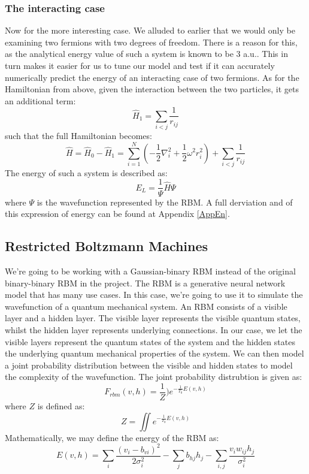 \documentclass{article}
\begin{document}
\subsubsection{The interacting case}
Now for the more interesting case. We alluded to earlier that we would only be examining two fermions with two degrees of freedom. There is a reason for this, as the analytical energy value of such a system is known to be 3 a.u.. This in turn makes it easier for us to tune our model and test if it can accurately numerically predict the energy of an interacting case of two fermions. \newline
As for the Hamiltonian from above, given the interaction between the two particles, it gets an additional term:
\begin{equation} \label{H1}
    \hat H_1 = \sum_{i<j} \frac{1}{r_{ij}}
\end{equation}
such that the full Hamiltonian becomes:
\begin{equation} \label{ham}
    \hat H = \hat H_0 - \hat H_1 = \sum_{i=1}^N \left( - \frac{1}{2}\nabla_i^2 + \frac{1}{2}\omega^2 r_i^2 \right) + \sum_{i<j} \frac{1}{r_{ij}}
\end{equation}
The energy of such a system is described as:
\begin{equation} \label{locEn}
    E_L = \frac{1}{\Psi} \hat H \Psi
\end{equation}
where $\Psi$ is the wavefunction represented by the RBM. A full derviation and of this expression of energy can be found at Appendix \ref{AppEn}.
\subsection{Restricted Boltzmann Machines}
We're going to be working with a Gaussian-binary RBM instead of the original binary-binary RBM in the project. The RBM is a generative neural network model that has many use cases. In this case, we're going to use it to simulate the wavefunction of a quantum mechanical system. An RBM consists of a visible layer and a hidden layer. The visible layer represents the visible quantum states, whilst the hidden layer represents underlying connections. \newline
In our case, we let the visible layers represent the quantum states of the system and the hidden states the underlying quantum mechanical properties of the system. We can then model a joint probability distribution between the visible and hidden states to model the complexity of the wavefunction.
\newline
The joint probability distrubtion is given as:
\begin{equation}
    F_{rbm}(v,h) = \frac{1}{Z}) e^{-\frac{1}{T_0}E(v,h)}
\end{equation}
where $Z$ is defined as:
\begin{equation*}
    Z = \iint e^{-\frac{1}{T_0} E(v,h)}
\end{equation*}
Mathematically, we may define the energy of the RBM as:
\begin{equation}
    E(v, h) = \sum_i \frac{(v_i - b_{vi})^2}{2\sigma_i^2} - \sum_j b_{hj} h_j - \sum_{i,j} \frac{v_i w_{ij}h_j}{\sigma_i^2}
\end{equation}
\end{document}

